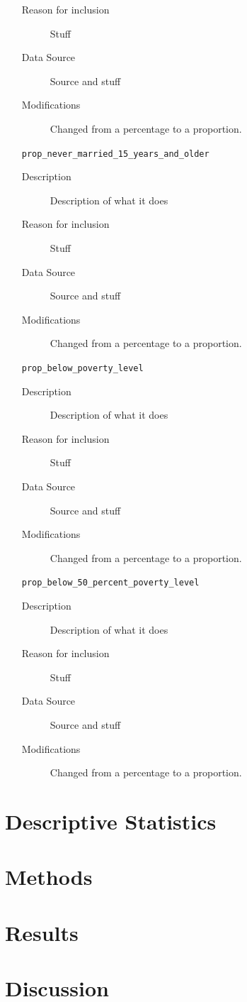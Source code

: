 \documentclass{article}
\begin{document}
\begin{itemize}[label={}, align=left]
\begin{description}
              \item[Reason for inclusion] Stuff
              \item[Data Source] Source and stuff
              \item[Modifications] Changed from a percentage to a proportion.
          \end{description}
    \item[\texttt{prop\_never\_married\_15\_years\_and\_older}] \
          \begin{description}
              \item[Description] Description of what it does
              \item[Reason for inclusion] Stuff
              \item[Data Source] Source and stuff
              \item[Modifications] Changed from a percentage to a proportion.
          \end{description}
    \item[\texttt{prop\_below\_poverty\_level}] \
          \begin{description}
              \item[Description] Description of what it does
              \item[Reason for inclusion] Stuff
              \item[Data Source] Source and stuff
              \item[Modifications] Changed from a percentage to a proportion.
          \end{description}
    \item[\texttt{prop\_below\_50\_percent\_poverty\_level}] \
          \begin{description}
              \item[Description] Description of what it does
              \item[Reason for inclusion] Stuff
              \item[Data Source] Source and stuff
              \item[Modifications] Changed from a percentage to a proportion.
          \end{description}
\end{itemize}

\section{Descriptive Statistics}
\section{Methods}
\section{Results}
\section{Discussion}
\end{document}
